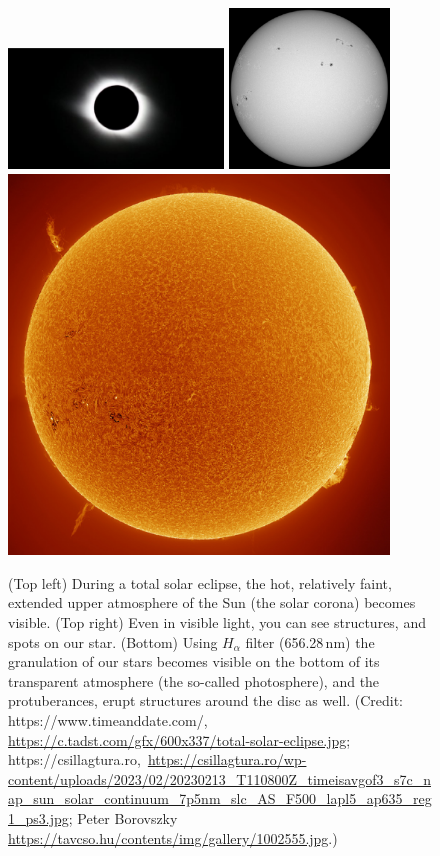 \documentclass[sn-aps]{sn-jnl}%
\begin{document}
\begin{figure}[t]
\centering
\includegraphics[width=0.51\textwidth]{facsko_iccecip2022-f01a.eps}
\includegraphics[width=0.38\textwidth]{facsko_iccecip2022-f01b.eps}
\includegraphics[width=0.9\textwidth]{facsko_iccecip2022-f01c.eps}
\caption{(Top left) During a total solar eclipse, the hot, relatively faint, extended upper atmosphere of the Sun (the solar corona) becomes visible. (Top right) Even in visible light, you can see structures, and spots on our star. (Bottom) Using $H_{\alpha}$ filter (656.28\,nm) the granulation of our stars becomes visible on the bottom of its transparent atmosphere (the so-called photosphere), and the protuberances, erupt structures around the disc as well. (Credit: https://www.timeanddate.com/, \url{https://c.tadst.com/gfx/600x337/total-solar-eclipse.jpg}; https://csillagtura.ro,~\url{https://csillagtura.ro/wp-content/uploads/2023/02/20230213_T110800Z_timeisavgof3_s7c_nap_sun_solar_continuum_7p5nm_slc_AS_F500_lapl5_ap635_reg1_ps3.jpg}; Peter Borovszky \url{https://tavcso.hu/contents/img/gallery/1002555.jpg}.)}\label{fig:sunvisible}
\end{figure}
\end{document}
